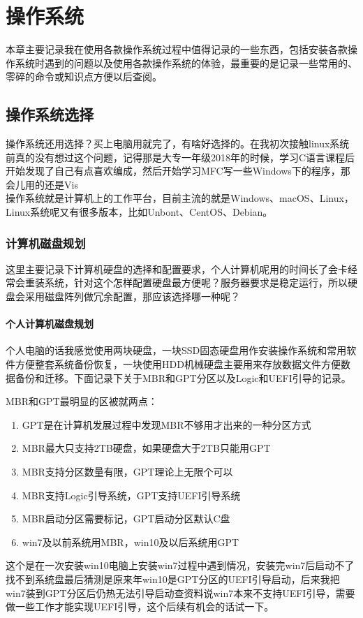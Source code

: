 \chapter{操作系统}
本章主要记录我在使用各款操作系统过程中值得记录的一些东西，包括安装各款操作系统时遇到的问题以及使用各款操作系统的体验，最重要的是记录一些常用的、零碎的命令或知识点方便以后查阅。
\section{操作系统选择}
操作系统还用选择？买上电脑用就完了，有啥好选择的。在我初次接触linux系统前真的没有想过这个问题，记得那是大专一年级2018年的时候，学习C语言课程后开始发现了自己有点喜欢编成，然后开始学习MFC写一些Windows下的程序，那会儿用的还是Vis\\
操作系统就是计算机上的工作平台，目前主流的就是Windows、macOS、Linux，Linux系统呢又有很多版本，比如Unbont、CentOS、Debian。
\subsection{计算机磁盘规划}
这里主要记录下计算机硬盘的选择和配置要求，个人计算机呢用的时间长了会卡经常会重装系统，针对这个怎样配置硬盘最方便呢？服务器要求是稳定运行，所以硬盘会采用磁盘阵列做冗余配置，那应该选择哪一种呢？
\subsubsection{个人计算机磁盘规划}
个人电脑的话我感觉使用两块硬盘，一块SSD固态硬盘用作安装操作系统和常用软件方便整套系统备份恢复，一块使用HDD机械硬盘主要用来存放数据文件方便数据备份和迁移。下面记录下关于MBR和GPT分区以及Logic和UEFI引导的记录。

MBR和GPT最明显的区被就两点：
\begin{enumerate}
	\item GPT是在计算机发展过程中发现MBR不够用才出来的一种分区方式
	\item MBR最大只支持2TB硬盘，如果硬盘大于2TB只能用GPT
	\item MBR支持分区数量有限，GPT理论上无限个可以
	\item MBR支持Logic引导系统，GPT支持UEFI引导系统
	\item MBR启动分区需要标记，GPT启动分区默认C盘
	\item win7及以前系统用MBR，win10及以后系统用GPT
\end{enumerate}
这个是在一次安装win10电脑上安装win7过程中遇到情况，安装完win7后启动不了找不到系统盘最后猜测是原来年win10是GPT分区的UEFI引导启动，后来我把win7装到GPT分区后仍热无法引导启动查资料说win7本来不支持UEFI引导，需要做一些工作才能实现UEFI引导，这个后续有机会的话试一下。
